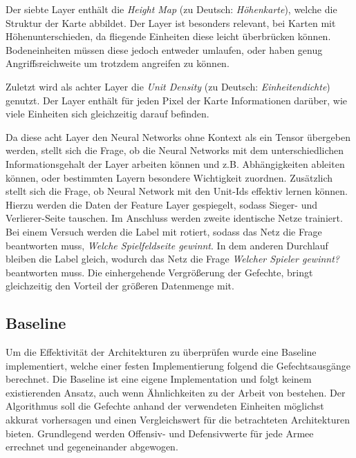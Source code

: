 Der siebte Layer enthält die \textit{Height Map} (zu Deutsch: \textit{Höhenkarte}), welche die Struktur der Karte abbildet. Der Layer ist besonders relevant, bei Karten mit Höhenunterschieden, da fliegende Einheiten diese leicht überbrücken können. Bodeneinheiten müssen diese jedoch entweder umlaufen, oder haben genug Angriffsreichweite um trotzdem angreifen zu können. 

Zuletzt wird als achter Layer die \textit{Unit Density} (zu Deutsch: \textit{Einheitendichte}) genutzt. Der Layer enthält für jeden Pixel der Karte Informationen darüber, wie viele Einheiten sich gleichzeitig darauf befinden. 

Da diese acht Layer den Neural Networks ohne Kontext als ein Tensor übergeben werden, stellt sich die Frage, ob die Neural Networks mit dem unterschiedlichen Informationsgehalt der Layer arbeiten können und z.B. Abhängigkeiten ableiten können, oder bestimmten Layern besondere Wichtigkeit zuordnen. Zusätzlich stellt sich die Frage, ob  Neural Network mit den Unit-Ids effektiv lernen können. Hierzu werden die Daten der Feature Layer gespiegelt, sodass Sieger- und Verlierer-Seite tauschen. Im Anschluss werden zweite identische Netze trainiert. Bei einem Versuch werden die Label mit rotiert, sodass das Netz die Frage beantworten muss, \textit{Welche Spielfeldseite gewinnt}. In dem anderen Durchlauf bleiben die Label gleich, wodurch das Netz die Frage \textit{Welcher Spieler gewinnt?} beantworten muss. Die einhergehende Vergrößerung der Gefechte, bringt gleichzeitig den Vorteil der größeren Datenmenge mit.


\subsection{Baseline}
Um die Effektivität der Architekturen zu überprüfen wurde eine Baseline implementiert, welche einer festen Implementierung folgend die Gefechtsausgänge berechnet. Die Baseline ist eine eigene Implementation und folgt keinem existierenden Ansatz, auch wenn Ähnlichkeiten zu der Arbeit von \textcite{AIIDE137381} bestehen. Der Algorithmus soll die Gefechte anhand der verwendeten Einheiten möglichst akkurat vorhersagen und einen Vergleichswert für die betrachteten Architekturen bieten. Grundlegend werden Offensiv- und Defensivwerte für jede Armee errechnet und gegeneinander abgewogen.

